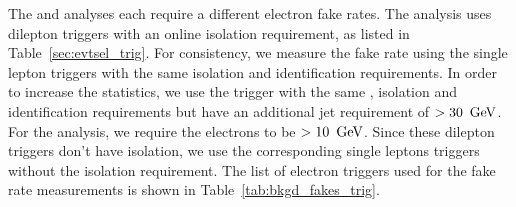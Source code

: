 The \hpt and \lpt analyses each require a different electron fake rates. The
\hpt analysis uses dilepton triggers with an online isolation requirement,
as listed in Table~\ref{sec:evtsel_trig}. For consistency, we measure the
fake rate using the single lepton triggers with the same isolation and
identification requirements. In order to increase the statistics, we use the
trigger with the same \Et, isolation and identification requirements but
have an additional jet requirement of $> 30\ \,\text{Ge\hspace{-.08em}V}$. For the \lpt
analysis, we require the electrons to be $> 10\ \GeV$. Since these dilepton
triggers don't have isolation, we use the corresponding single leptons triggers
without the isolation requirement. The list of electron triggers used for the
fake rate measurements is shown in Table~\ref{tab:bkgd_fakes_trig}.
